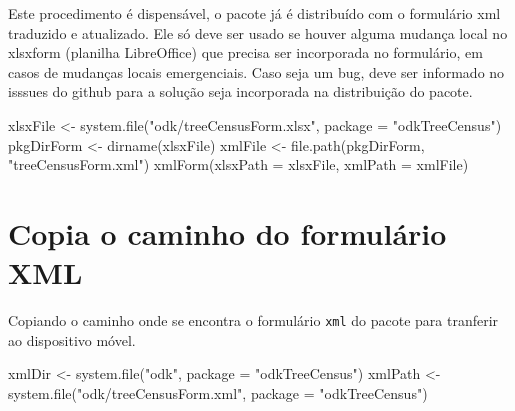 \documentclass[
  letterpaper,
]{report}
\newenvironment{Shaded}{\begin{snugshade}}{\end{snugshade}}
\newcommand{\AttributeTok}[1]{\textcolor[rgb]{0.40,0.45,0.13}{#1}}
\newcommand{\FunctionTok}[1]{\textcolor[rgb]{0.28,0.35,0.67}{#1}}
\newcommand{\NormalTok}[1]{\textcolor[rgb]{0.00,0.23,0.31}{#1}}
\newcommand{\OtherTok}[1]{\textcolor[rgb]{0.00,0.23,0.31}{#1}}
\newcommand{\StringTok}[1]{\textcolor[rgb]{0.13,0.47,0.30}{#1}}
\begin{document}
\begin{tcolorbox}[enhanced jigsaw, arc=.35mm, bottomrule=.15mm, bottomtitle=1mm, breakable, colback=white, colbacktitle=quarto-callout-warning-color!10!white, colframe=quarto-callout-warning-color-frame, coltitle=black, left=2mm, leftrule=.75mm, opacityback=0, opacitybacktitle=0.6, rightrule=.15mm, title=\textcolor{quarto-callout-warning-color}{\faExclamationTriangle}\hspace{0.5em}{Atenção}, titlerule=0mm, toprule=.15mm, toptitle=1mm]

Este procedimento é dispensável, o pacote já é distribuído com o
formulário xml traduzido e atualizado. Ele só deve ser usado se houver
alguma mudança local no xlsxform (planilha LibreOffice) que precisa ser
incorporada no formulário, em casos de mudanças locais emergenciais.
Caso seja um bug, deve ser informado no isssues do github para a solução
seja incorporada na distribuição do pacote.

\end{tcolorbox}

\begin{Shaded}
\begin{Highlighting}[]
\NormalTok{xlsxFile }\OtherTok{\textless{}{-}} \FunctionTok{system.file}\NormalTok{(}\StringTok{"odk/treeCensusForm.xlsx"}\NormalTok{, }\AttributeTok{package =} \StringTok{"odkTreeCensus"}\NormalTok{)}
\NormalTok{pkgDirForm }\OtherTok{\textless{}{-}} \FunctionTok{dirname}\NormalTok{(xlsxFile)}
\NormalTok{xmlFile }\OtherTok{\textless{}{-}} \FunctionTok{file.path}\NormalTok{(pkgDirForm, }\StringTok{"treeCensusForm.xml"}\NormalTok{)}
\FunctionTok{xmlForm}\NormalTok{(}\AttributeTok{xlsxPath =}\NormalTok{ xlsxFile, }\AttributeTok{xmlPath =}\NormalTok{ xmlFile)}
\end{Highlighting}
\end{Shaded}

\section{Copia o caminho do formulário
XML}\label{copia-o-caminho-do-formuluxe1rio-xml}

Copiando o caminho onde se encontra o formulário \texttt{xml} do pacote
para tranferir ao dispositivo móvel.

\begin{Shaded}
\begin{Highlighting}[]
\NormalTok{xmlDir }\OtherTok{\textless{}{-}} \FunctionTok{system.file}\NormalTok{(}\StringTok{"odk"}\NormalTok{, }\AttributeTok{package =} \StringTok{"odkTreeCensus"}\NormalTok{)}
\NormalTok{xmlPath }\OtherTok{\textless{}{-}} \FunctionTok{system.file}\NormalTok{(}\StringTok{"odk/treeCensusForm.xml"}\NormalTok{, }\AttributeTok{package =} \StringTok{"odkTreeCensus"}\NormalTok{)}
\end{Highlighting}
\end{Shaded}
\end{document}
